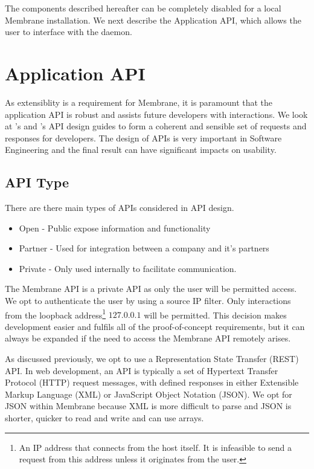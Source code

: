 \documentclass[11pt, a4paper, twoside]{report}
\begin{document}
The components described hereafter can be completely disabled for a local Membrane installation. We next describe the Application API, which allows the user to interface with the daemon.

\section{Application API}

As extensiblity is a requirement for Membrane, it is paramount that the application API is robust and assists future developers with interactions. We look at \cite{google2017api}'s and \cite{heroku2017api}'s API design guides to form a coherent and sensible set of requests and responses for developers. The design of APIs is very important in Software Engineering and the final result can have significant impacts on usability. \citep{benslimane2008services} 

\subsection{API Type}

There are there main types of APIs considered in API design. \citep{boyd2017api}

\begin{itemize}
 \item Open - Public expose information and functionality
 \item Partner - Used for integration between a company and it's partners
 \item Private - Only used internally to facilitate communication.
\end{itemize}

The Membrane API is a private API as only the user will be permitted access. We opt to authenticate the user by using a source IP filter. Only interactions from the loopback address\footnote{An IP address that connects from the host itself. \citep{hinden2006ip} It is infeasible to send a request from this address unless it originates from the user.} $127.0.0.1$ will be permitted. This decision makes development easier and fulfils all of the proof-of-concept requirements, but it can always be expanded if the need to access the Membrane API remotely arises.

As discussed previously, we opt to use a Representation State Transfer (REST) API. In web development, an API is typically a set of Hypertext Transfer Protocol (HTTP) request messages, with defined responses in either Extensible Markup Language (XML) or JavaScript Object Notation (JSON). We opt for JSON within Membrane because XML is more difficult to parse and JSON is shorter, quicker to read and write and can use arrays.
\end{document}
